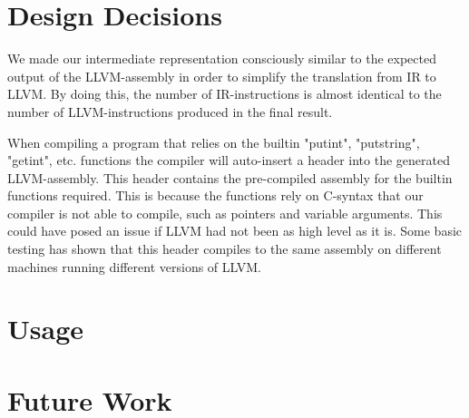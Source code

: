 
\section{Design Decisions}

We made our intermediate representation consciously similar to the expected output of the LLVM-assembly in order to simplify the translation from IR to LLVM. By doing this, the number of IR-instructions is almost identical to the number of LLVM-instructions produced in the final result.

When compiling a program that relies on the builtin "putint", "putstring", "getint", etc. functions the compiler will auto-insert a header into the generated LLVM-assembly. This header contains the pre-compiled assembly for the builtin functions required. This is because the functions rely on C-syntax that our compiler is not able to compile, such as pointers and variable arguments. This could have posed an issue if LLVM had not been as high level as it is. Some basic testing has shown that this header compiles to the same assembly on different machines running different versions of LLVM.



\section{Usage}

\section{Future Work}

